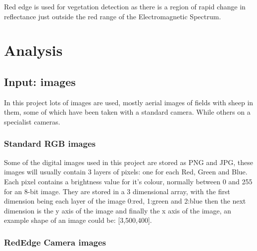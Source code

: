 Red edge is used for vegetation detection as there is a region of rapid change in reflectance just outside the red range of the Electromagnetic Spectrum.


\section{Analysis}
\begin{comment}
Taking into account the problem and what you learned from the background work, what was your analysis of the problem? How did your analysis help to decompose the problem into the main tasks that you would undertake? Were there alternative approaches? Why did you choose one approach compared to the alternatives? 

There should be a clear statement of the research questions, which you will evaluate at the end of the work. 

In most cases, the agreed objectives or requirements will be the result of a compromise between what would ideally have been produced and what was felt to be possible in the time available. A discussion of the process of arriving at the final list is usually appropriate.
\end{comment}

\subsection{Input: images}
In this project lots of images are used, mostly aerial images of fields with sheep in them, some of which have been taken with a standard camera. While others on a specialist cameras.
\subsubsection{Standard RGB images}

Some of the digital images used in this project are stored as PNG and JPG, these images will usually contain 3 layers of pixels: one for each Red, Green and Blue. Each pixel contains a brightness value for it's colour, normally between 0 and 255 for an 8-bit image. They are stored in a 3 dimensional array, with the first dimension being each layer of the image 0:red, 1:green and 2:blue then the next dimension is the y axis of the image and finally the x axis of the image, an example shape of an image could be: [3,500,400].

\subsubsection{RedEdge Camera images}
    
